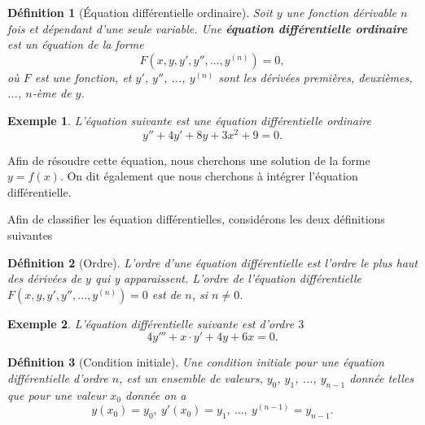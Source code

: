 \documentclass[a4paper,12pt]{book}
\newtheorem{definition}{Définition}
\newtheorem*{exemple}{Exemple}
\begin{document}
\begin{definition}[Équation différentielle ordinaire]
Soit $y$ une fonction dérivable $n$ fois et dépendant d'une seule variable. Une \textbf{équation différentielle ordinaire} est un équation de la forme 
\begin{equation}
 F(x,y,y',y'',...,y^{(n)})=0,
\end{equation}
où $F$ est une fonction, et $y'$, $y''$, ..., $y^{(n)}$ sont les dérivées premières, deuxièmes, ..., $n$-ème de $y$. 
\end{definition}
\begin{exemple}
L'équation suivante est une équation différentielle ordinaire
\begin{equation}
 y''+4y'+8y+3x^2+9=0.
\end{equation}
\end{exemple}

Afin de résoudre cette équation, nous cherchons une solution de la forme $y=f(x)$.
On dit également que nous cherchons à intégrer l'équation différentielle.

Afin de classifier les équation différentielles, considérons les deux définitions suivantes
\begin{definition}[Ordre]
 L'ordre d'une équation différentielle est l'ordre le plus haut des dérivées de $y$ qui y apparaissent.
 L'ordre de l'équation différentielle $F(x,y,y',y'',...,y^{(n)})=0$ est de $n$, si $n\neq 0$.
\end{definition}

\begin{exemple}
L'équation différentielle suivante est d'ordre $3$
\begin{equation}
4y'''+x\cdot y'+4y+6x=0.
\end{equation}
\end{exemple} 


\begin{definition}[Condition initiale]
 Une condition initiale pour une équation différentielle d'ordre $n$, est un ensemble de valeurs, $y_0$, $y_1$, ..., $y_{n-1}$
 donnée telles que pour une valeur $x_0$ donnée on a
 \begin{equation}
  y(x_0)=y_0,\ y'(x_0)=y_1,\ ...,\ y^{(n-1)}=y_{n-1}.
 \end{equation}
\end{definition}
\end{document}
